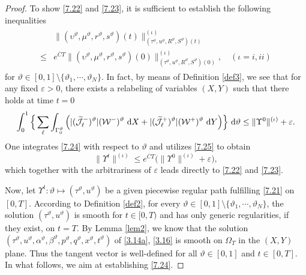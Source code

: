 \documentclass[11pt,reqno]{article}
\newcommand{\eps}{\varepsilon}
\numberwithin{equation}{section}
\begin{document}
\begin{proof}
To show \eqref{7.22} and \eqref{7.23}, it is sufficient to establish the following inequalities
\begin{align}\label{7.24}
\begin{split}
&\|(\upsilon^\vartheta, \mu^\vartheta, r^\vartheta, s^\vartheta)(t)\|_{(\tau^\vartheta, u^\vartheta, R^\vartheta, S^\vartheta)(t)}^{(\iota)} \\
\leq& e^{\overline{C}T}\|(\upsilon^\vartheta, \mu^\vartheta, r^\vartheta, s^\vartheta)(0)\|_{(\tau^\vartheta, u^\vartheta, R^\vartheta, S^\vartheta)(0)}^{(\iota)},\quad (\iota=i, ii)
\end{split}
\end{align}
for $\vartheta\in[0,1]\setminus\{\vartheta_1,\cdots, \vartheta_N\}$. In fact, by means of Definition \ref{def3}, we see that for any fixed $\eps>0$, there exists a relabeling of variables $(X,Y)$ such that there holds at time $t=0$
\begin{align}\label{7.25}
\begin{split}
\int_{0}^1 \Big\{\sum_{\ell} \int_{\Gamma_{0}^\vartheta}\Big(|(\widetilde{\mathcal{J}}_{\ell}^-)^\vartheta|(\mathcal{W}^-)^\vartheta\ {\rm d}X +|(\widetilde{\mathcal{J}}_{\ell}^+)^\vartheta|(\mathcal{W}^+)^\vartheta\ {\rm d}Y\Big)\Big\}\ {\rm d}\vartheta \leq \|\Upsilon^0\|^{(\iota)}+\eps.
\end{split}
\end{align}
One integrates \eqref{7.24} with respect to $\vartheta$ and utilizes \eqref{7.25} to obtain
$$
\|\Upsilon^t\|^{(\iota)}\leq e^{\overline{C}T}\Big(\|\Upsilon^0\|^{(\iota)}+\eps\Big),
$$
which together with the arbitrariness of $\eps$ leads directly to \eqref{7.22} and \eqref{7.23}.

Now, let $\Upsilon^t: \vartheta\mapsto (\tau^\vartheta, u^\vartheta)$ be a given piecewise regular path fulfilling \eqref{7.21} on $[0,T]$. According to Definition \ref{def2}, for every $\vartheta\in[0,1]\setminus\{\vartheta_1,\cdots, \vartheta_N\}$, the solution $(\tau^\vartheta, u^\vartheta )$ is smooth for $t\in[0, T)$ and has only generic regularities, if they exist, on $t=T$. By Lemma \ref{lem2}, we know that the solution $(\tau^\vartheta, u^\vartheta, \alpha^\vartheta, \beta^\vartheta, p^\vartheta, q^\vartheta, x^\vartheta, t^\vartheta)$ of \eqref{3.14a}, \eqref{3.16} is smooth on $\Omega_T$ in the $(X,Y)$ plane. Thus the tangent vector is well-defined for all $\vartheta\in[0,1]$ and $t\in[0,T]$. In what follows, we aim at establishing \eqref{7.24}.


\end{proof}
\end{document}
